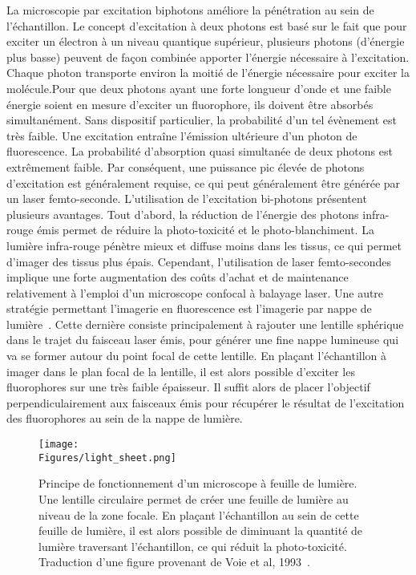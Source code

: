 \documentclass[\main/main.tex]{subfiles}
\begin{document}
%
La microscopie par excitation biphotons améliore la pénétration au sein de l'échantillon.
%
Le concept d'excitation à deux photons est basé sur le fait que pour exciter un électron à un niveau quantique supérieur, plusieurs photons (d’énergie plus basse) peuvent de façon combinée apporter l’énergie nécessaire à l’excitation. Chaque photon transporte environ la moitié de l'énergie nécessaire pour exciter la molécule.Pour que deux photons ayant une forte longueur d'onde et une faible énergie soient en mesure d'exciter un fluorophore, ils doivent être absorbés simultanément. Sans dispositif particulier, la probabilité d'un tel évènement est très faible.  Une excitation entraîne l'émission ultérieure d'un photon de fluorescence. La probabilité d'absorption quasi simultanée de deux photons est extrêmement faible. Par conséquent, une puissance pic élevée de photons d'excitation est généralement requise, ce qui peut généralement être générée par un laser femto\hyp{}seconde.
%
L'utilisation de l'excitation bi-photons présentent plusieurs avantages. Tout d'abord, la réduction de l'énergie des photons infra-rouge émis permet de réduire la photo-toxicité et le photo-blanchiment.
%
La lumière infra-rouge pénètre mieux et diffuse moins dans les tissus, ce qui permet d'imager des tissus plus épais.
%
Cependant, l'utilisation de laser femto\hyp{}secondes implique une forte augmentation des coûts d'achat et de maintenance relativement à l'emploi d'un microscope confocal à balayage laser.
\label{sec:spim}
Une autre stratégie permettant l'imagerie en fluorescence est l'imagerie par nappe de lumière~\cite{voie_1993}. Cette dernière consiste principalement à rajouter une lentille sphérique dans le trajet du faisceau laser émis, pour générer une fine nappe lumineuse qui va se former autour du point focal de cette lentille.
%
En plaçant l'échantillon à imager dans le plan focal de la lentille,
il est alors possible d'exciter les fluorophores sur une très faible épaisseur.
%
Il suffit alors de placer l'objectif perpendiculairement aux faisceaux émis pour récupérer le résultat de l'excitation des fluorophores au sein de la nappe de lumière.

\begin{figure}[h!]{\textwidth} 
    \centering
       \centering \texttt{[image: \\Figures/light\_sheet.png]}
       \caption{
            \label{fig:confocal}
            Principe de fonctionnement d'un microscope à feuille de lumière.
            \newline
            Une lentille circulaire permet de créer une feuille de lumière au niveau de la zone focale.
            En plaçant l'échantillon au sein de cette feuille de lumière, il est alors possible de diminuant la quantité de lumière traversant l'échantillon, ce qui réduit la photo\hyp{}toxicité. 
            \newline
            Traduction d'une figure provenant de Voie et al, 1993~\cite{voie_1993}.
            }
\end{figure}
\end{document}
